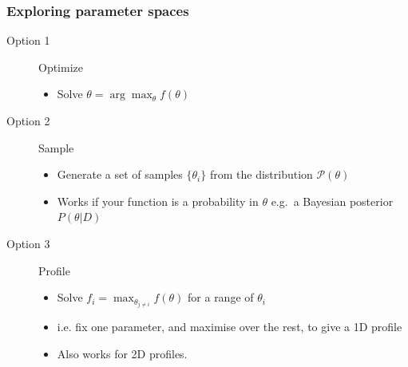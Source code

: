 \documentclass[aspectratio=169]{beamer}
\begin{document}

\begin{frame}
    \frametitle{Exploring parameter spaces}
    \begin{description}
        \item[Option 1] Optimize
            \begin{itemize}
                \item Solve $\theta = \arg\max_\theta f(\theta)$
            \end{itemize}
        \item[Option 2] Sample
            \begin{itemize}
                \item Generate a set of samples $\{\theta_i\}$ from the distribution $\mathcal{P}(\theta)$
                \item Works if your function is a probability  in $\theta$ e.g.\ a Bayesian posterior  $P(\theta|D)$
            \end{itemize}
        \item[Option 3] Profile
            \begin{itemize}
                \item Solve $f_i = \max_{\theta_{j\ne i}} f(\theta)$ for a range of $\theta_i$
                \item i.e. fix one parameter, and maximise over the rest, to give a 1D profile
                \item Also works for 2D profiles.
            \end{itemize}
    \end{description}
    
\end{frame}
\end{document}
